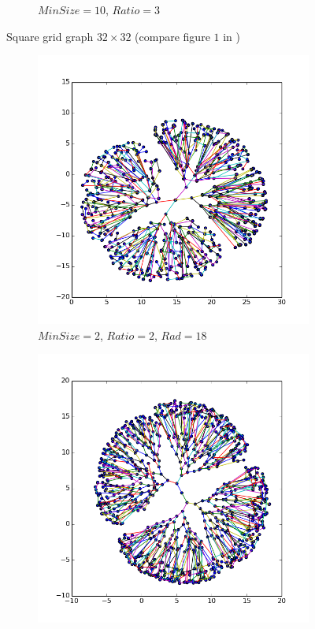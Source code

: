 \documentclass[12pt,a4paper]{article}
\begin{document}
\begin{figure}[htb]
\begin{subfigure}{0.5\textwidth}
            \caption{$MinSize=10$, $Ratio=3$}
     \end{subfigure}
     \caption{Square grid graph $32\times 32$ (compare figure $1$ in \cite{DavidHarel2002})}
     \label{fig: difMinSize}
\end{figure}     

\begin{figure}[htb]
	 \begin{subfigure}{0.5\textwidth}
		   \centering
           \includegraphics[scale=0.45]{results_Harel/HK_btree1023_m2_r2_rad18.png}
           \caption{$MinSize=2$, $Ratio=2$, $Rad =18$}
     \end{subfigure}
	 \begin{subfigure}{0.5\textwidth}
			\centering
           \includegraphics[scale=0.45]{results_Harel/HK_btree1023_m10_r3_rad18.png}

\end{subfigure}
\end{figure}
\end{document}
